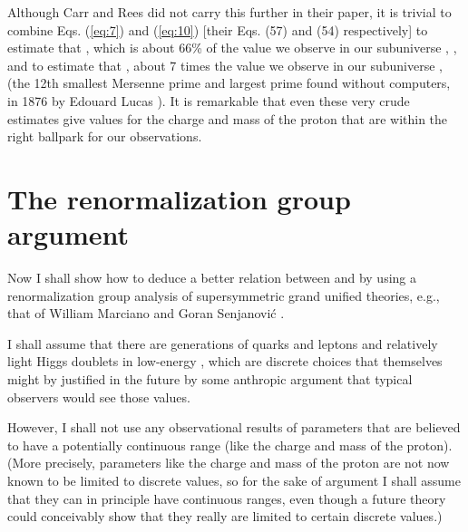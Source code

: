 \documentclass[a4paper,12pt]{article}
\begin{document}
	Although Carr and Rees did not carry this further
in their paper, it is trivial to combine Eqs. (\ref{eq:7})
and (\ref{eq:10}) [their Eqs. (57) and (54) respectively]
to estimate that \coordHE{}, which is about 66\%
of the value we observe in our subuniverse \cite{PDG},
\coordHE{},
and to estimate that \coordHE{},
about 7 times the value we observe in our subuniverse \cite{PDG},
\coordHE{}
(the 12th smallest Mersenne prime and largest prime found
without computers, in 1876 by Edouard Lucas \cite{Lucas}).
It is remarkable that even these very crude estimates
give values for the charge and mass of the proton that
are within the right ballpark for our observations.

\section{The renormalization group argument}

	Now I shall show how to deduce a better relation
between \coordHE{} and \coordHE{}
by using a renormalization group analysis of
supersymmetric grand unified theories, e.g.,
that of William Marciano and Goran Senjanovi\'c \cite{MarCen}.

	I shall assume that there are \coordHE{} generations
of quarks and leptons and \coordHE{} relatively light Higgs doublets
in low-energy \coordHE{},
which are discrete choices that themselves might by justified
in the future by some anthropic argument that typical observers
would see those values.

	However, I shall not use any observational
results of parameters that are believed to have a potentially
continuous range (like the charge and mass of the proton).
(More precisely, parameters like the charge and mass of the proton
are not now known to be limited to discrete values,
so for the sake of argument I shall assume that they can in principle
have continuous ranges,
even though a future theory could conceivably show that they
really are limited to certain discrete values.)
\end{document}
